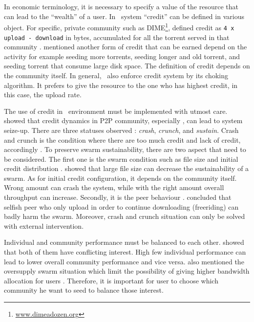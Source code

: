 In economic terminology, it is necessary to specify a value of the resource that can lead to the ``wealth'' of a user. In \bt~system ``credit'' can be defined in various object. For specific, private community such as DIME\footnote{\url{www.dimeadozen.org}}, \citeauthor{2012:economicbt:kash}  defined credit as \texttt{4 x upload - download} in bytes, accumulated for all the torrent served in that community \cite{2012:economicbt:kash}. \citeauthor{2014:sustainabilitytorrent:chen} mentioned another form of credit that can be earned depend on the activity for example seeding more torrents, seeding longer and old torrent, and seeding torrent that consume large disk space\cite{2014:sustainabilitytorrent:chen}. The definition of credit depends on the community itself. In general, \bt~also enforce credit system by its choking algorithm. It prefers to give the resource to the one who has highest credit, in this case, the upload rate.

The use of credit in \bt~environment must be implemented with utmost care. \citeauthor{2010:crashsustain:rahman} showed that credit dynamics in P2P community, especially \bt, can lead to system seize-up. There are three statuses observed : \textit{crash}, \textit{crunch}, and \textit{sustain}. Crash and crunch is the condition where there are too much credit and lack of credit, accordingly \cite{2015:sustainabilitypt:vinko}. To preserve swarm sustainability, there are two aspect that need to be considered. The first one is the swarm condition such as file size and initial credit distribution \cite{2015:sustainabilitypt:vinko}. \citeauthor{2015:sustainabilitypt:vinko} showed that large file size can decrease the sustainability of a swarm. As for initial credit configuration, it depends on the community itself. Wrong amount can crash the system, while with the right amount overall throughput can increase. Secondly, it is the peer behaviour \cite{2010:crashsustain:rahman}. \citeauthor{2010:crashsustain:rahman} concluded that selfish peer who only upload in order to continue downloading (freeriding) can badly harm the swarm. Moreover, crash and crunch situation can only be solved with external intervention.

Individual and community performance must be balanced to each other. \citeauthor{2015:sustainabilitypt:vinko} showed that both of them have conflicting interest. High few individual performance can lead to lower overall community performance and vice versa.  \citeauthor{2013:survivepriv:jia} also mentioned the oversupply swarm situation which limit the possibility of giving higher bandwidth allocation for users \cite{2013:survivepriv:jia}. Therefore, it is important for user to choose which community he want to seed to balance those interest.

